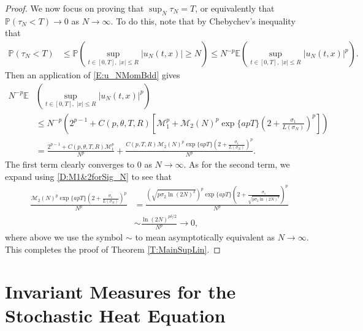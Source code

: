 \documentclass[12pt]{report}
\theoremstyle{plain}
\theoremstyle{definition}
\numberwithin{equation}{section}
\begin{document}
\begin{proof}
	We now focus on proving that $\sup_N \tau_N = T$, or equivalently that $ \mathbb{P}\left(\tau_N <T\right) \to 0$ as $N \to \infty$. To do this, note that by Chebychev's inequality that
	\begin{align*}
	\mathbb{P}\left( \tau_N < T \right) &\le \mathbb{P}\left(\sup_{t\in[0,T],\; |x| \le R} |u_N(t,x)| \ge N \right) 
	\le N^{-p}\mathbb{E}\left( \sup_{t\in[0,T],\; |x| \le R} |u_N(t,x)|^p \right).
	\end{align*}
	Then an application of \eqref{E:u_NMomBdd} gives 
	\begin{align*}
	N^{-p}\mathbb{E} & \left( \sup_{t\in[0,T],\; |x| \le R} |u_N(t,x)|^p \right) \\
	& \le N^{-p}\left(  2^{p-1} + C(p, \theta, T,R) \left[ \mathcal{M}_1^p + \mathcal{M}_2(N)^p \exp\{apT\} \left(2 +  \frac{\sigma_1}{L(\sigma_N)}\right)^p\right]\right) \\
	&= \frac{2^{p-1} + C(p, \theta, T,R)\mathcal{M}_1^p }{N^p} + \frac{C(p,T,R) \mathcal{M}_2(N)^p \exp\{apT\} \left(2 +  \frac{\sigma_1}{L(\sigma_N)}\right)^p }{ N^p }.
	\end{align*}
	The first term clearly converges to $0$ as $N\to \infty$. As for the second term, we expand using \eqref{D:M1&2forSig_N} to see that 
	\begin{align*}
	\frac{\mathcal{M}_2(N)^p \exp\{apT\} \left(2 +  \frac{\sigma_1}{L(\sigma_N)}\right)^p }{ N^p } &= \frac{\left(\sqrt{p\sigma_2\ln(2N)^\delta}\right)^p \exp\{apT\} \left(2 +  \frac{\sigma_1}{ \sqrt{p\sigma_2\ln(2N)^\delta} }\right)^p }{ N^p }  \\
	&\sim \frac{ \ln(2N)^{p\delta/2} }{ N^p } \to 0,
	\end{align*}
	where above we use the symbol $\sim$ to mean asymptotically equivalent as $N \to \infty$. This completes the proof of Theorem \ref{T:MainSupLin}. 
\end{proof}

\chapter{ \normalfont Invariant Measures for the Stochastic Heat Equation} \label{Ch:InvMeas}
\end{document}
